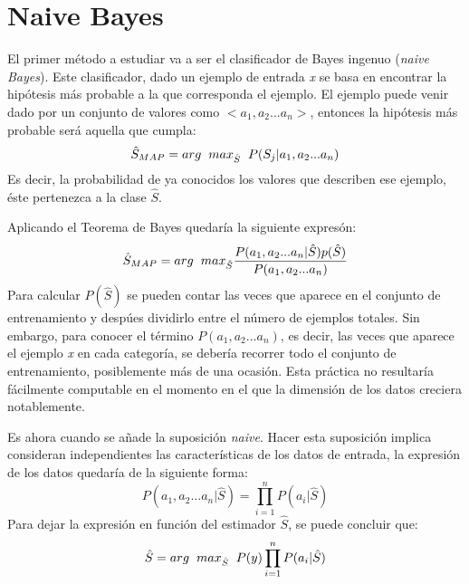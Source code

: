 \section{Naive Bayes}
	El primer método a estudiar va a ser el clasificador de Bayes ingenuo (\textit{naive Bayes}). Este clasificador, dado un ejemplo de entrada \textit{x} se basa en encontrar la hipótesis más probable a la que corresponda el ejemplo.\cite{naive} El ejemplo puede venir dado por un conjunto de valores como $<a_1, a_2...a_n>$, entonces la hipótesis más probable será aquella que cumpla:
	\begin{equation}
		\hat{S}_{MAP} = arg\hspace{0.2cm}max_{\hat{S}}\hspace{0.2cm}P(S_j|a_1,a_2...a_n)
	\end{equation}
	Es decir, la probabilidad de ya conocidos los valores que describen ese ejemplo, éste pertenezca a la clase $\hat{S}$. \par 
	\vspace{0.5cm}
	Aplicando el Teorema de Bayes quedaría la siguiente expresón:
	\begin{equation}
		\hat{S}_{MAP} =  arg\hspace{0.2cm}max_{\hat{S}}\dfrac{P(a_1,a_2...a_n|\hat{S})p(\hat{S})}{P(a_1, a_2...a_n)}
	\end{equation}
	Para calcular $P(\hat{S})$ se pueden contar las veces que aparece en el conjunto de entrenamiento y despúes dividirlo entre el número de ejemplos totales. Sin embargo, para conocer el término $P(a_1,a_2...a_n)$, es decir, las veces que aparece el ejemplo \textit{x} en cada categoría, se debería recorrer todo el conjunto de entrenamiento, posiblemente más de una ocasión. Esta práctica no resultaría fácilmente computable en el momento en el que la dimensión de los datos creciera notablemente.\cite{naive}\par 
	Es ahora cuando se añade la suposición \textit{naive}. Hacer esta suposición implica consideran independientes las características de los datos de entrada, la expresión de los datos quedaría de la siguiente forma:
	\begin{equation}
		P(a_1, a_2...a_n|\hat{S}) = \prod_{i=1}^{n}{P(a_i|\hat{S})}
	\end{equation}
	Para dejar la expresión en función del estimador $\hat{S}$, se puede concluir que:
	\begin{equation}
		\hat{S} = arg\hspace{0.2cm}max_{\hat{S}} \hspace{0.2cm} P(y) \prod_{i=1}^{n}{P(a_i|\hat{S})}
	\end{equation}
	
